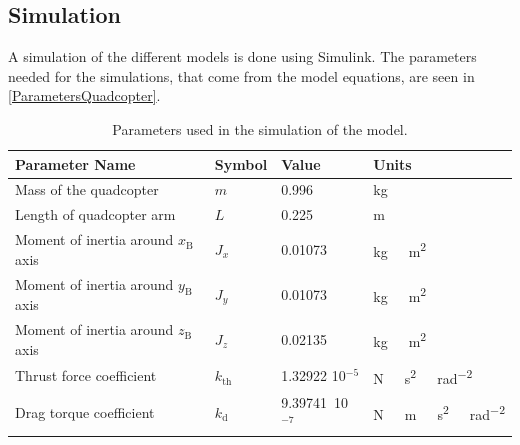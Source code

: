 \subsection{Simulation}
A simulation of the different models is done using Simulink. The parameters needed for the simulations, that come from the model equations, are seen in \autoref{ParametersQuadcopter}.
\begin{table}[H]
	\centering
	\begin{tabular}{|l|l|l|l|}
		\hline %
		\textbf{Parameter Name}         &\textbf{Symbol} &\textbf{Value}          &\textbf{Units}             \\
		\hline %
		Mass of the quadcopter          & $m$            & 0.996             & \si{kg}                   \\
		\hline %
    Length of quadcopter arm        & $L$            & 0.225            & \si{m}                    \\
    \hline %
		Moment of inertia around $x_{\mathrm{B}}$ axis & $J_x$          & 0.01073           & \si{kg\ m^2}              \\
		\hline %
		Moment of inertia around $y_{\mathrm{B}}$ axis & $J_y$          & 0.01073           & \si{kg\ m^2}              \\
		\hline %
		Moment of inertia around $z_{\mathrm{B}}$ axis & $J_z$          & 0.02135           & \si{kg\ m^2}              \\
		\hline %
		Thrust force coefficient        & $k_{\mathrm{th}}$       & 1.32922 10$^{-5}$  & \si{N\ s^2\ rad^{-2}}     \\
		\hline %
		Drag torque coefficient         & $k_{\mathrm{d}}$        & 9.39741\ 10$^{-7}$  & \si{N\ m\  s^2\ rad^{-2}} \\
		\hline %
	\end{tabular}
	\caption{Parameters used in the simulation of the model.}
	\label{ParametersQuadcopter}
\end{table}\vspace{-18pt}

